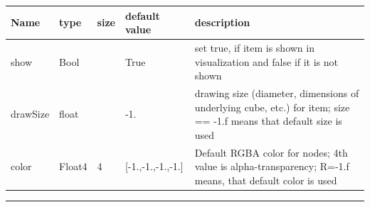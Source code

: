 \begin{center}
  \footnotesize
  \begin{longtable}{| p{4.5cm} | p{2.5cm} | p{0.5cm} | p{2.5cm} | p{6cm} |}
    \hline
    \bf Name & \bf type & \bf size & \bf default value & \bf description \\ \hline
    show &     Bool &      &     True &     set true, if item is shown in visualization and false if it is not shown\\ \hline
    drawSize &     float &      &     -1. &     drawing size (diameter, dimensions of underlying cube, etc.)  for item; size == -1.f means that default size is used\\ \hline
    color &     Float4 &     4 &     [-1.,-1.,-1.,-1.] &     Default RGBA color for nodes; 4th value is alpha-transparency; R=-1.f means, that default color is used\\ \hline
	  \end{longtable}
	\end{center}
\par\noindent\rule{\textwidth}{0.4pt}
\label{description_NodeRigidBody2D}
